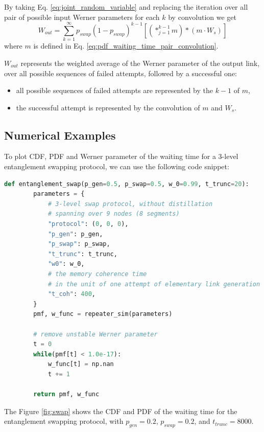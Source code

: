 \documentclass{masterthesis}
\begin{document}
By taking Eq. \ref{eq:joint_random_variable} and replacing the iteration over all pair of possible input Werner parameters for each $k$ by convolution we get
\begin{equation}\label{werner_parameter_swap}
    W_{out} = \sum_{k=1}^{\infty} p_{swap} (1 - p_{swap})^{k-1} \left[ \left( \ast_{j=1}^{k-1} m \right) \ast \left( m \cdot W_{s} \right) \right]
\end{equation}
where $m$ is defined in Eq. \ref{eq:pdf_waiting_time_pair_convolution}.

$W_{out}$ represents the weighted average of the Werner parameter of the output link, over all possible sequences of failed attempts, followed by a successful one:
\begin{itemize}
    \item all possible sequences of failed attempts are represented by the $k-1$ of $m$,
    \item the successful attempt is represented by the convolution of $m$ and $W_{s}$.
\end{itemize}

\subsection*{Numerical Examples}

To plot CDF, PDF and Werner parameter of the waiting time for a 3-level entanglement swapping protocol, we can use the following code snippet:
\begin{lstlisting}[language=Python]
    def entanglement_swap(p_gen=0.5, p_swap=0.5, w_0=0.99, t_trunc=20):
        parameters = {
            # 3-level swap protocol, without distillation
            # spanning over 9 nodes (8 segments)
            "protocol": (0, 0, 0),
            "p_gen": p_gen,
            "p_swap": p_swap,
            "t_trunc": t_trunc,
            "w0": w_0,
            # the memory coherence time 
            # in the unit of one attempt of elementary link generation
            "t_coh": 400,
        }
        pmf, w_func = repeater_sim(parameters)
        
        # remove unstable Werner parameter
        t = 0
        while(pmf[t] < 1.0e-17):
            w_func[t] = np.nan
            t += 1

        return pmf, w_func
\end{lstlisting}

The Figure \ref{fig:swap} shows the CDF and PDF of the waiting time for the entanglement swapping protocol, with $p_{gen} = 0.2$, $p_{swap} = 0.2$, and $t_{trunc} = 8000$. 
\end{document}
